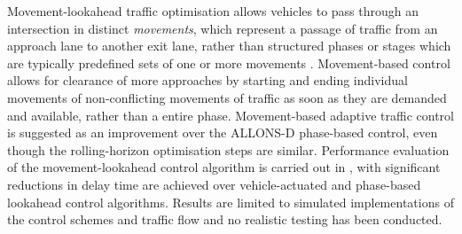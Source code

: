 Movement-lookahead traffic optimisation allows vehicles to pass through an intersection in distinct \emph{movements}, which represent a passage of traffic from an approach lane to another exit lane, rather than structured phases or stages which are typically predefined sets of one or more movements  \cite{van2008movement,pandit2013adaptive}. Movement-based control allows for clearance of more approaches by starting and ending individual movements of non-conflicting movements of traffic as soon as they are demanded and available, rather than a entire phase. Movement-based adaptive traffic control is suggested as an improvement over the ALLONS-D phase-based control, even though the rolling-horizon optimisation steps are similar. Performance evaluation of the movement-lookahead control algorithm is carried out in \cite{van2008movement}, with significant reductions in delay time are achieved over vehicle-actuated and phase-based lookahead control algorithms. Results are limited to simulated implementations of the control schemes and traffic flow and no realistic testing has been conducted.









